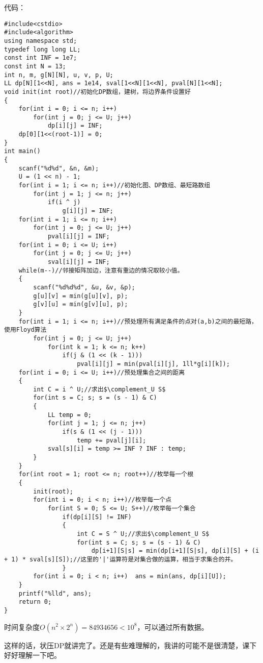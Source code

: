 	代码：
	\begin{verbatim}
#include<cstdio>
#include<algorithm>
using namespace std;
typedef long long LL;
const int INF = 1e7;
const int N = 13;
int n, m, g[N][N], u, v, p, U;
LL dp[N][1<<N], ans = 1e14, sval[1<<N][1<<N], pval[N][1<<N];
void init(int root)//初始化DP数组，建树，将边界条件设置好 
{
    for(int i = 0; i <= n; i++)
        for(int j = 0; j <= U; j++)
            dp[i][j] = INF;
    dp[0][1<<(root-1)] = 0;
}
int main()
{
    scanf("%d%d", &n, &m);
    U = (1 << n) - 1;
    for(int i = 1; i <= n; i++)//初始化图、DP数组、最短路数组 
        for(int j = 1; j <= n; j++)
            if(i ^ j)
                g[i][j] = INF;
    for(int i = 1; i <= n; i++)
        for(int j = 0; j <= U; j++)
            pval[i][j] = INF;
    for(int i = 0; i <= U; i++)
        for(int j = 0; j <= U; j++)
            sval[i][j] = INF;
    while(m--)//邻接矩阵加边，注意有重边的情况取较小值。 
    {
        scanf("%d%d%d", &u, &v, &p);
        g[u][v] = min(g[u][v], p);
        g[v][u] = min(g[v][u], p);
    }
    for(int i = 1; i <= n; i++)//预处理所有满足条件的点对(a,b)之间的最短路，使用Floyd算法 
        for(int j = 0; j <= U; j++)
            for(int k = 1; k <= n; k++)
                if(j & (1 << (k - 1)))
                    pval[i][j] = min(pval[i][j], 1ll*g[i][k]);
    for(int i = 0; i <= U; i++)//预处理集合之间的距离 
    {
        int C = i ^ U;//求出$\complement_U S$
        for(int s = C; s; s = (s - 1) & C)
        {
            LL temp = 0;
            for(int j = 1; j <= n; j++)
                if(s & (1 << (j - 1)))
                    temp += pval[j][i];
            sval[s][i] = temp >= INF ? INF : temp;
        }
    }
    for(int root = 1; root <= n; root++)//枚举每一个根 
    {
        init(root);
        for(int i = 0; i < n; i++)//枚举每一个点 
            for(int S = 0; S <= U; S++)//枚举每一个集合 
                if(dp[i][S] != INF)
                {
                    int C = S ^ U;//求出$\complement_U S$ 
                    for(int s = C; s; s = (s - 1) & C)
                        dp[i+1][S|s] = min(dp[i+1][S|s], dp[i][S] + (i + 1) * sval[s][S]);//这里的'|'运算符是对集合做的运算，相当于求集合的并。 
                }
        for(int i = 0; i < n; i++)  ans = min(ans, dp[i][U]);
    }
    printf("%lld", ans);
    return 0;
}
\end{verbatim}

	时间复杂度$O(n^2\times 2^n)=84934656<10^8$，可以通过所有数据。

	这样的话，状压DP就讲完了。还是有些难理解的，我讲的可能不是很清楚，课下好好理解一下吧。

